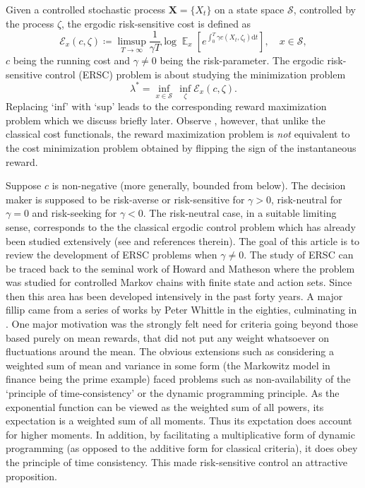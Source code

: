 \documentclass[notitlepage,11pt,reqno]{amsart}
\numberwithin{equation}{section}
\theoremstyle{plain}
\theoremstyle{definition}
\theoremstyle{remark}
\newcommand{\sE}{{\mathscr{E}}}     %
\newcommand{\cS}{{\mathcal{S}}}     %
\DeclareMathOperator{\Exp}{\mathbb{E}} %
\newcommand{\D}{\mathrm{d}} %
\newcommand{\df}{\coloneqq}
\begin{document}
Given a controlled stochastic process $\textbf{X}=\{X_t\}$ on a
state space $\cS$, controlled by 
the process $\zeta$, the ergodic risk-sensitive cost is defined as
$$\sE_x(c, \zeta)\df\limsup_{T\to\infty} \frac{1}{\gamma T}
\log \Exp_x\left[e^{\int_0^T \gamma c(X_t, \zeta_t)\D{t}}\right],\quad x\in\cS,$$
$c$ being the running cost and $\gamma\neq 0$ being the risk-parameter. The 
ergodic risk-sensitive control (ERSC) problem is about studying the
minimization problem
$$\lambda^*=\inf_{x\in\cS}\, \inf_{\zeta}\sE_x(c, \zeta).$$
Replacing `inf' with `sup' leads to the corresponding reward maximization problem which we discuss briefly later. Observe , however, that unlike the classical cost functionals, the reward maximization problem is \textit{not} equivalent to the cost minimization problem obtained by flipping the sign of the instantaneous reward. 

 Suppose $c$ is non-negative (more generally, bounded from below). The decision maker is supposed to be risk-averse or risk-sensitive for
$\gamma>0$, risk-neutral for $\gamma=0$ and risk-seeking for $\gamma<0$. 
The risk-neutral case, in a suitable limiting sense,  corresponds to the the classical ergodic control problem which has already been studied extensively
(see \cites{ABFGM93,red-book} and references therein). 
The goal of this article is to review the development 
of ERSC problems when $\gamma\neq 0$. The study of ERSC can be traced
back to the seminal work of Howard and Matheson \cite{Howard-71} where 
the problem was studied for controlled Markov chains with finite state and action sets. Since then this
area has been developed intensively in the past forty years. A major fillip came from a series of works by Peter Whittle in the eighties, culminating in \cite{Whit-90}. One major motivation was the strongly felt need for criteria going beyond those based purely on mean rewards, that did not put any weight whatsoever on fluctuations around the mean. The obvious extensions such as considering a weighted sum of mean and variance in some form (the Markowitz model in finance being the prime example) faced problems such as non-availability of the `principle of time-consistency' or the dynamic programming principle. As the exponential function can be viewed as the weighted sum of all powers, its expectation is a weighted sum of all moments. Thus its expctation does account for higher moments. In addition, by facilitating a multiplicative form of dynamic programming (as opposed  to the additive form for classical criteria), it does obey the principle of time consistency. This made risk-sensitive control an attractive proposition.
\end{document}
